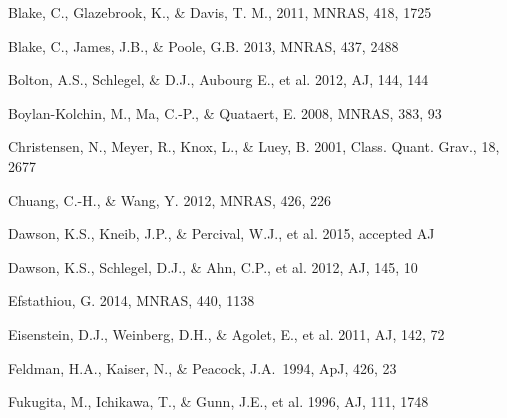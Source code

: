 \documentclass[useAMS,usenatbib]{mnras}
\begin{document}
\begin{thebibliography}{}
Blake, C., Glazebrook, K., \& Davis, T. M., 2011, MNRAS, 418, 1725  

Blake, C., James, J.B., \& Poole, G.B. 2013, MNRAS, 437, 2488

Bolton, A.S., Schlegel, \& D.J., Aubourg E., et al. 2012, AJ, 144, 144

Boylan-Kolchin, M., Ma, C.-P., \& Quataert, E. 2008, MNRAS, 383, 93






Christensen, N., Meyer, R., Knox, L., \& Luey, B. 2001, Class. Quant. Grav., 18, 2677


Chuang, C.-H., \& Wang, Y. 2012, MNRAS, 426, 226  



Dawson, K.S., Kneib, J.P., \& Percival, W.J., et al. 2015, accepted AJ

Dawson, K.S., Schlegel, D.J., \& Ahn, C.P., et al. 2012, AJ, 145, 10

Efstathiou, G. 2014, MNRAS, 440, 1138

Eisenstein, D.J.,  Weinberg, D.H., \& Agolet, E., et al. 2011, AJ, 142, 72

Feldman, H.A., Kaiser, N., \& Peacock, J.A.\ 1994, ApJ, 426, 23 

Fukugita, M., Ichikawa, T., \& Gunn, J.E., et al. 1996, AJ, 111, 1748


\end{thebibliography}
\end{document}
